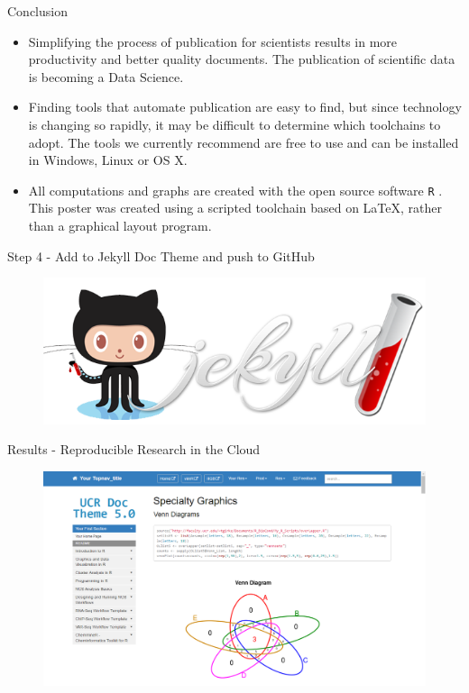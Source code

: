 \documentclass[final]{beamer}
\begin{document}
\begin{frame}[fragile]
\begin{columns}[t]
\begin{column}{0.31\linewidth}
\begin{minipage}[t][.955\textheight]{\linewidth}
\vspace{0ex}
\begin{block}{Conclusion}
\begin{itemize}
\item Simplifying the process of publication for scientists results in more productivity and better quality documents. The publication of scientific data is becoming a Data Science.
\item Finding tools that automate publication are easy to find, but since technology is changing so rapidly, it may be difficult to determine which toolchains to adopt. The tools we currently recommend are free to use and can be installed in Windows, Linux or OS X.
\item All computations and graphs are created with the open source software \texttt{R} \cite{R-base}. This poster was created using a scripted toolchain based on LaTeX, rather than a graphical layout program. 
\end{itemize}
\vspace{0ex}
\end{block}
\vfill

\vspace{0ex}
\begin{block}{Step 4 - Add to Jekyll Doc Theme and push to GitHub}
\vspace{0ex}
\begin{figure}
\includegraphics[width=0.55\linewidth]{images/jekyll_github.png}
\end{figure}
\vspace{0ex}
\vfill
\end{block}
\vfill

\begin{block}{Results - Reproducible Research in the Cloud}
\begin{figure}
\includegraphics[width=\linewidth]{images/UCRdocTheme.png}
\end{figure}
\vspace{0ex}
\vfill
\end{block}
\vfill


\end{minipage}
\end{column}
\end{columns}
\end{frame}
\end{document}
